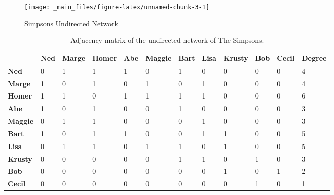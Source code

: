 \documentclass[
  notitlepage,
  onecolumn,
  openany]{book}
\begin{document}
\begin{figure}
\texttt{[image: \_main\_files/figure-latex/unnamed-chunk-3-1]} \caption{Simpsons Undirected Network}\label{fig:unnamed-chunk-3}
\end{figure}

\begin{table}[h]
\centering
\begin{tabular}{@{}llllllllllll@{}}
\toprule
\textbf{}       & \textbf{Ned} & \textbf{Marge} & \textbf{Homer} & \textbf{Abe} & \textbf{Maggie} & \textbf{Bart} & \textbf{Lisa} & \textbf{Krusty} & \textbf{Bob} & \textbf{Cecil} & \textbf{Degree} \\ \midrule
\textbf{Ned}    & 0            & 1              & 1              & 1            & 0               & 1             & 0             & 0               & 0            & 0              & 4               \\
\textbf{Marge}  & 1            & 0              & 1              & 0            & 1               & 0             & 1             & 0               & 0            & 0              & 4               \\
\textbf{Homer}  & 1            & 1              & 0              & 1            & 1               & 1             & 1             & 0               & 0            & 0              & 6               \\
\textbf{Abe}    & 1            & 0              & 1              & 0            & 0               & 1             & 0             & 0               & 0            & 0              & 3               \\
\textbf{Maggie} & 0            & 1              & 1              & 0            & 0               & 0             & 1             & 0               & 0            & 0              & 3               \\
\textbf{Bart}   & 1            & 0              & 1              & 1            & 0               & 0             & 1             & 1               & 0            & 0              & 5               \\
\textbf{Lisa}   & 0            & 1              & 1              & 0            & 1               & 1             & 0             & 1               & 0            & 0              & 5               \\
\textbf{Krusty} & 0            & 0              & 0              & 0            & 0               & 1             & 1             & 0               & 1            & 0              & 3               \\
\textbf{Bob}    & 0            & 0              & 0              & 0            & 0               & 0             & 0             & 1               & 0            & 1              & 2               \\
\textbf{Cecil}  & 0            & 0              & 0              & 0            & 0               & 0             & 0             & 0               & 1            & 0              & 1               \\ \bottomrule
\end{tabular}
\caption{Adjacency matrix of the undirected network of The Simpsons.}
\label{tab:undirected_network}
\end{table}
\end{document}
